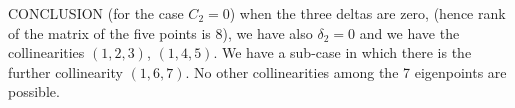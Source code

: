 \documentclass[11pt]{article}
\makeatletter
\newcommand{\boxspacing}{\kern\kvtcb@left@rule\kern\kvtcb@boxsep}
\newcommand{\prompt}[4]{
        {\ttfamily\llap{{\color{#2}[#3]:\hspace{3pt}#4}}\vspace{-\baselineskip}}
    }
\makeatother
\begin{document}
    CONCLUSION (for the case \(C_2 = 0\)) when the three deltas are zero,
(hence rank of the matrix of the five points is \(8\)), we have also
\(\delta_2 = 0\) and we have the collinearities \((1, 2, 3)\),
\((1, 4, 5)\). We have a sub-case in which there is the further
collinearity \((1, 6, 7)\). No other collinearities among the 7
eigenpoints are possible.

    \begin{tcolorbox}[breakable, size=fbox, boxrule=1pt, pad at break*=1mm,colback=cellbackground, colframe=cellborder]
\prompt{In}{incolor}{ }{\boxspacing}
\begin{Verbatim}[commandchars=\\\{\}]

\end{Verbatim}
\end{tcolorbox}


    
    
    
\end{document}
